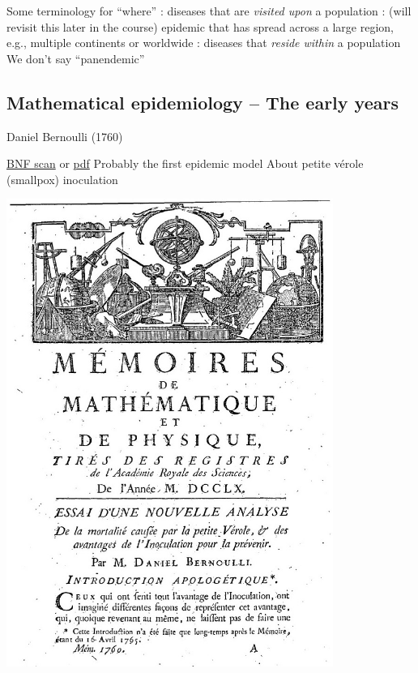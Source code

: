 \documentclass[aspectratio=169]{beamer}\usepackage[]{graphicx}\usepackage[]{xcolor}
\begin{document}
\begin{frame}{Some terminology for ``where''}
\bbullet {}: diseases that are \emph{visited upon} a population
\vfill
\bbullet {}: (will revisit this later in the course) epidemic that has spread across a large region, e.g., multiple continents or worldwide
\vfill
\bbullet {}: diseases that \emph{reside within} a population
\vfill
\bbullet We don't say ``panendemic''
\end{frame}


\subsection{Mathematical epidemiology -- The early years}

\begin{frame}{Daniel Bernoulli (1760)}
\begin{minipage}{0.47\textwidth}
\bbullet \href{https://gallica.bnf.fr/ark:/12148/bpt6k3558n/f220.item}{BNF scan} or \href{https://julien-arino.github.io/assets/pdf/Bernoulli-1760.pdf}{pdf}
\vskip1cm
\bbullet Probably the first epidemic model
\vskip1cm
\bbullet About petite vérole (smallpox) inoculation    
\end{minipage}
\begin{minipage}{0.5\textwidth}
    \includegraphics[width=0.8\textwidth]{FIGS/Bernoulli-1760-first_page.jpg}
\end{minipage}
\end{frame}
\end{document}
